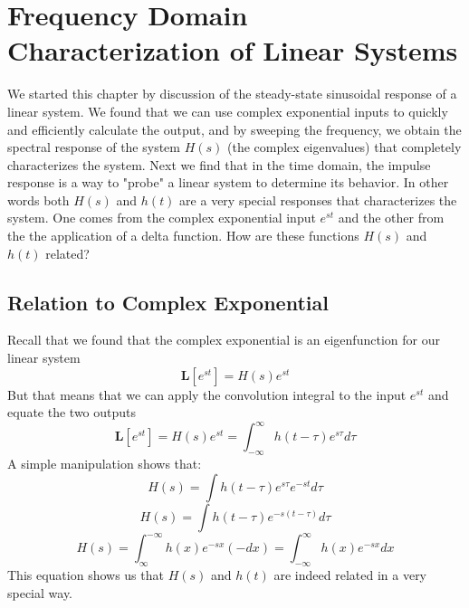 \section{Frequency Domain Characterization of Linear Systems}
We started this chapter by discussion of the steady-state sinusoidal response of a linear system.  We found that we can use complex exponential inputs to quickly and efficiently calculate the output, and by sweeping the frequency, we obtain the spectral response of the system $H(s)$ (the complex eigenvalues) that completely characterizes the system.   Next we find that in the time domain, the impulse response is a way to "probe" a linear system to determine its behavior.  In other words both $H(s)$ and $h(t)$ are a very special responses that characterizes the system.  One comes from the complex exponential input $e^{st}$ and the other from the the application of a delta function.  How are these functions $H(s)$ and $h(t)$ related?
\subsection{Relation to Complex Exponential}
Recall that we found that the complex exponential is an eigenfunction for our linear system 
    \begin{equation}
        \mathbf{L} [ e^{st} ] = H(s) e^{st}
    \end{equation}
But that means that we can apply the convolution integral to the input $e^{st}$ and equate the two outputs
    \begin{equation}
        \mathbf{L} [ e^{st} ] = H(s) e^{st}  = \int_{-\infty}^{\infty} h(t-\tau) e^{s\tau} d\tau
    \end{equation}
A simple manipulation shows that:
    \begin{equation}
        H(s) = \int h(t-\tau) e^{s\tau} e^{-st} d\tau
    \end{equation}
    \begin{equation}
        H(s) = \int h(t-\tau) e^{-s(t- \tau)}  d\tau
    \end{equation}
    \begin{equation}
        H(s) = \int_{\infty}^{-\infty} h(x) e^{-sx} (-dx) = \int_{-\infty}^{\infty} h(x) e^{-sx} dx 
    \end{equation}
This equation shows us that $H(s)$ and $h(t)$ are indeed related in a very special way.
